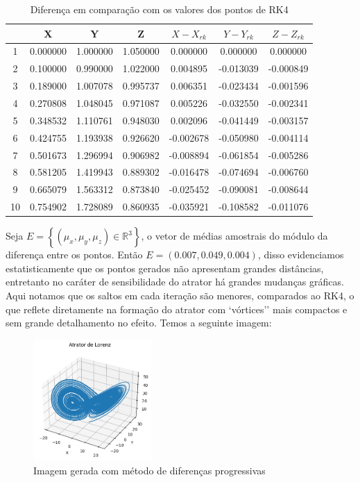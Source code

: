 \documentclass[12pt, a4paper]{article}
\begin{document}
    \begin{table}[H]
        \centering
        \begin{tabular}{|c|c|c|c|c|c|c|}
            \hline
             & X & Y & Z & $X-X_{rk}$ & $Y-Y_{rk}$ & $Z-Z_{rk}$ \\
            \hline
            1 & 0.000000 & 1.000000 & 1.050000 & 0.000000 & 0.000000 & 0.000000 \\
            2 & 0.100000 & 0.990000 & 1.022000 & 0.004895 & -0.013039 & -0.000849 \\
            3 & 0.189000 & 1.007078 & 0.995737 & 0.006351 & -0.023434 & -0.001596 \\
            4 & 0.270808 & 1.048045 & 0.971087 & 0.005226 & -0.032550 & -0.002341 \\
            5 & 0.348532 & 1.110761 & 0.948030 & 0.002096 & -0.041449 & -0.003157 \\
            6 & 0.424755 & 1.193938 & 0.926620 & -0.002678 & -0.050980 & -0.004114 \\
            7 & 0.501673 & 1.296994 & 0.906982 & -0.008894 & -0.061854 & -0.005286 \\
            8 & 0.581205 & 1.419943 & 0.889302 & -0.016478 & -0.074694 & -0.006760 \\
            9 & 0.665079 & 1.563312 & 0.873840 & -0.025452 & -0.090081 & -0.008644 \\
            10 & 0.754902 & 1.728089 & 0.860935 & -0.035921 & -0.108582 & -0.011076 \\
            \hline
        \end{tabular}
        \caption{Diferença em comparação com os valores dos pontos de RK4}
        \label{tab:rk44-diff}
    \end{table}
    
    Seja $E = \left\{(\mu_x, \mu_y, \mu_z) \in \mathbb{R}^3\right\}$, o vetor de médias amostrais do módulo da diferença entre os pontos. Então $E = (0.007, 0.049, 0.004)$, disso evidenciamos estatisticamente que os pontos gerados não apresentam grandes distâncias, entretanto no caráter de sensibilidade do atrator há grandes mudanças gráficas. Aqui notamos que os saltos em cada iteração são menores, comparados ao RK4, o que reflete diretamente na formação do atrator com `vórtices'' mais compactos e sem grande detalhamento no efeito. Temos a seguinte imagem: 
    
    \begin{figure}[H]
        \centering
        \includegraphics[width=0.4\textwidth]{img/attrator10000_lorenz.png}
        \caption{Imagem gerada com método de diferenças progressivas}
        \label{fig:diff-prog}
    \end{figure}
    
\end{document}
